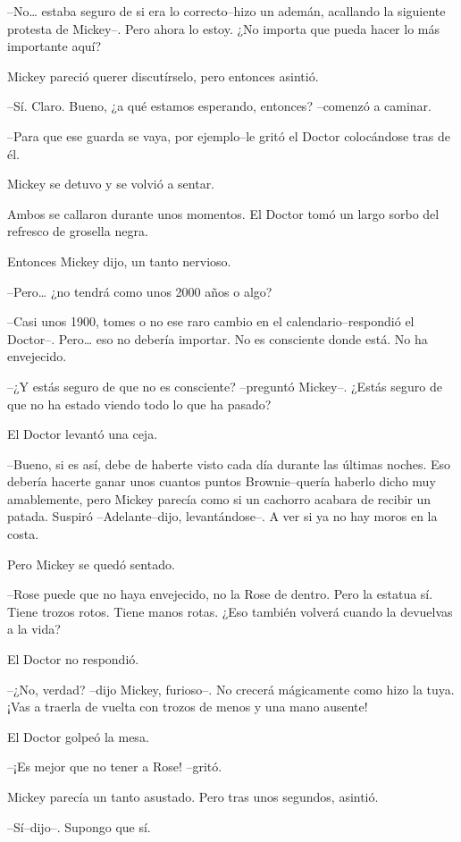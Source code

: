 --No\ldots{} estaba seguro de si era lo correcto--hizo un ademán,
acallando la siguiente protesta de Mickey--. Pero ahora lo estoy. ¿No
importa que pueda hacer lo más importante aquí?

Mickey pareció querer discutírselo, pero entonces asintió.

--Sí. Claro. Bueno, ¿a qué estamos esperando, entonces? --comenzó a
caminar.

--Para que ese guarda se vaya, por ejemplo--le gritó el Doctor
colocándose tras de él.

Mickey se detuvo y se volvió a sentar.

Ambos se callaron durante unos momentos. El Doctor tomó un largo sorbo
del refresco de grosella negra.

Entonces Mickey dijo, un tanto nervioso.

--Pero\ldots{} ¿no tendrá como unos 2000 años o algo?

--Casi unos 1900, tomes o no ese raro cambio en el calendario--respondió
el Doctor--. Pero\ldots{} eso no debería importar. No es consciente
donde está. No ha envejecido.

--¿Y estás seguro de que no es consciente? --preguntó Mickey--. ¿Estás
seguro de que no ha estado viendo todo lo que ha pasado?

El Doctor levantó una ceja.

--Bueno, si es así, debe de haberte visto cada día durante las últimas
noches. Eso debería hacerte ganar unos cuantos puntos Brownie--quería
haberlo dicho muy amablemente, pero Mickey parecía como si un cachorro
acabara de recibir un patada. Suspiró --Adelante--dijo, levantándose--.
A ver si ya no hay moros en la costa.

Pero Mickey se quedó sentado.

--Rose puede que no haya envejecido, no la Rose de dentro. Pero la
estatua sí. Tiene trozos rotos. Tiene manos rotas. ¿Eso también volverá
cuando la devuelvas a la vida?

El Doctor no respondió.

--¿No, verdad? --dijo Mickey, furioso--. No crecerá mágicamente como
hizo la tuya. ¡Vas a traerla de vuelta con trozos de menos y una mano
ausente!

El Doctor golpeó la mesa.

--¡Es mejor que no tener a Rose! --gritó.

Mickey parecía un tanto asustado. Pero tras unos segundos, asintió.

--Sí--dijo--. Supongo que sí.

